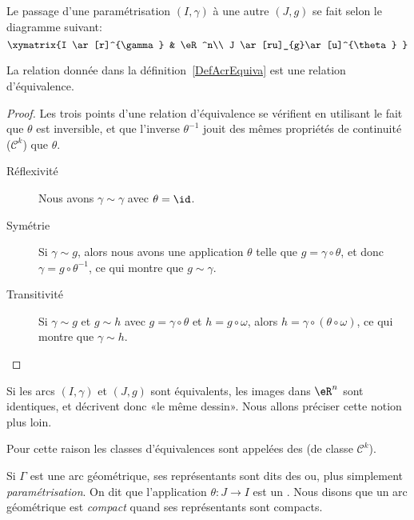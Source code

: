 Le passage d'une paramétrisation $(I,\gamma)$ à une autre $(J,g)$ se fait selon le diagramme suivant:
\begin{equation}
\xymatrix{%
I \ar[r]^{\gamma}   &   \eR^n\\
J \ar[ru]_{g}\ar[u]^{\theta}
   }
\end{equation}

\begin{proposition}
La relation donnée dans la définition~\ref{DefAcrEquiva} est une relation d'équivalence.
\end{proposition}

\begin{proof}
Les trois points d'une relation d'équivalence se vérifient en utilisant le fait que $\theta$ est inversible, et que l'inverse $\theta^{-1}$ jouit des mêmes propriétés de continuité ($\mathcal{C}^k$) que $\theta$.
\begin{description}
    \item[Réflexivité] Nous avons $\gamma\sim \gamma$ avec $\theta=\id$.
    \item[Symétrie] Si $\gamma\sim g$, alors nous avons une application $\theta$ telle que $g=\gamma\circ\theta$, et donc $\gamma=g\circ\theta^{-1}$, ce qui montre que $g\sim \gamma$.
    \item[Transitivité] Si $\gamma\sim g$ et $g\sim h$ avec $g=\gamma\circ\theta$ et $h=g\circ\omega$, alors $h=\gamma\circ(\theta\circ\omega)$, ce qui montre que $\gamma\sim h$.
\end{description}
\end{proof}
Si les arcs $(I,\gamma)$ et $(J,g)$ sont équivalents, les images dans $\eR^n$ sont identiques, et décrivent donc «le même dessin». Nous allons préciser cette notion plus loin.

\begin{definition}
    Pour cette raison les classes d'équivalences sont appelées des  (de classe $\mathcal{C}^k$).
\end{definition}

Si $\Gamma$ est une arc géométrique, ses représentants sont dits des  ou, plus simplement \emph{paramétrisation}. On dit que l'application $\theta\colon J\to I$ est un . Nous disons que un arc géométrique est \emph{compact} quand ses représentants sont compacts.


